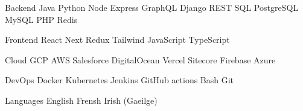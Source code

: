 

\begin{cvskills}

  \cvskill
    {Backend} %
    {Java \cpshalf Python \cpshalf Node \cpshalf Express \cpshalf GraphQL \cpshalf Django \cpshalf REST \cpshalf SQL \cpshalf PostgreSQL \cpshalf MySQL \cpshalf PHP \cpshalf Redis} %

  \cvskill
    {Frontend} %
    {React \cpshalf Next \cpshalf Redux \cpshalf Tailwind \cpshalf JavaScript \cpshalf TypeScript} %

  \cvskill
    {Cloud} %
    {GCP \cpshalf AWS \cpshalf Salesforce \cpshalf DigitalOcean \cpshalf Vercel \cpshalf Sitecore \cpshalf Firebase \cpshalf Azure} %

  \cvskill
    {DevOps} %
    {Docker \cpshalf Kubernetes \cpshalf Jenkins \cpshalf GitHub actions \cpshalf Bash \cpshalf Git} %

  \cvskill
    {Languages} %
    {English \cpshalf Frensh \cpshalf Irish (Gaeilge)} %

\end{cvskills}
